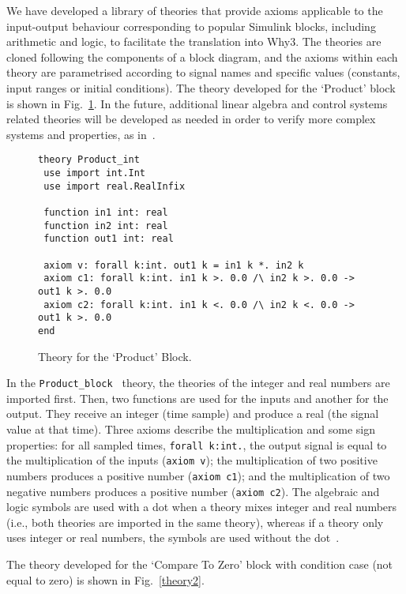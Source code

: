 \documentclass[a4paper]{article}
\begin{document}
We have developed a library of theories that provide axioms applicable to the input-output behaviour corresponding to popular Simulink blocks, including arithmetic and logic, to facilitate the translation into Why3. The theories are cloned following the components of a block diagram, and the axioms within each theory are parametrised according to signal names and specific values (constants, input ranges or initial conditions). The theory developed for the `Product' block is shown in Fig.~\ref{theory}. In the future, additional linear algebra and control systems related theories will be developed as needed in order to verify more complex systems and properties, as in~\cite{Herencia}. 

\begin{figure}[!t]
\begin{center}
\begin{verbatim}
theory Product_int
 use import int.Int  
 use import real.RealInfix
 
 function in1 int: real
 function in2 int: real
 function out1 int: real
 
 axiom v: forall k:int. out1 k = in1 k *. in2 k
 axiom c1: forall k:int. in1 k >. 0.0 /\ in2 k >. 0.0 -> out1 k >. 0.0
 axiom c2: forall k:int. in1 k <. 0.0 /\ in2 k <. 0.0 -> out1 k >. 0.0
end
\end{verbatim}
\end{center}
\caption{Theory for the `Product' Block.}
\label{theory}
\end{figure}

In the \verb+Product_block + theory, the theories of the integer and real numbers are imported first. Then, two functions are used for the inputs and another for the output. They receive an integer (time sample) and produce a real (the signal value at that time). Three axioms describe the multiplication and some sign properties: for all sampled times, \verb+forall k:int.+, the output signal is equal to the multiplication of the inputs (\verb+axiom v+);  the multiplication of two positive numbers produces a positive number (\verb+axiom c1+); and the multiplication of two negative numbers produces a positive number (\verb+axiom c2+). The algebraic and logic symbols are used with a dot when a theory mixes integer and real numbers (i.e., both theories are imported in the same theory), whereas if a theory only uses integer or real numbers, the symbols are used without the dot~\cite{Why3man}. 

The theory developed for the `Compare To Zero' block with condition case  (not equal to zero) is shown in Fig.~\ref{theory2}.  
\end{document}
